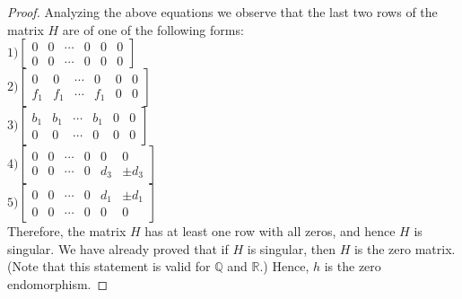 \documentclass[a4paper,leqno,12pt]{amsart}
\theoremstyle{plain}
\theoremstyle{definition}
\theoremstyle{remark}
\newcommand{\R}{\mathbb{R}}
\newcommand{\Q}{\mathbb{Q}}
\begin{document}
{\begin{proof}
\noindent
Analyzing the above equations we observe that the last two rows of the matrix $H$ are of one of the following forms: \\

$1) \begin{bmatrix}
 
  0  &  0 & \cdots &  0 &  0 & 0 \\
  0  &  0 & \cdots &  0 &  0 & 0
  
\end{bmatrix} $ \\


$2) \begin{bmatrix}
 
  0  &  0 & \cdots &  0 &  0 & 0 \\
  f_{1}  &  f_{1} & \cdots &  f_{1} &  0 & 0
  
\end{bmatrix} $ \\


$3) \begin{bmatrix}
 
  b_{1}  &  b_{1} &  \cdots &  b_{1} &  0 & 0 \\
  0  &  0 & \cdots &  0 &  0 & 0
  
\end{bmatrix}$\\


$4) \begin{bmatrix}
 
  0  &  0 & \cdots &  0 &  0 & 0 \\
  0  &  0 &  \cdots &  0 &  d_{3} & \pm d_{3}
  
\end{bmatrix}$ \\ 


$5) \begin{bmatrix}
 
  0  &  0 & \cdots &  0 &  d_{1} & \pm d_{1} \\
  0  &  0 & \cdots &  0 &  0 & 0
  
\end{bmatrix}$ \\

\noindent
Therefore,  the matrix $H$ has at least one row with all zeros,  and hence $H$ is singular.  We have already proved that if $H$ is singular,  then $H$ is the zero matrix.  (Note that this statement is valid for $\Q$ and $\R$.) Hence,  $h$  is the zero endomorphism.

\end{proof}

}
\end{document}
